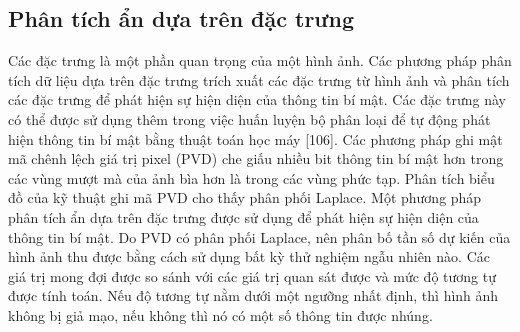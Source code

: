 \subsection{Phân tích ẩn dựa trên đặc trưng}
Các đặc trưng là một phần quan trọng của một hình ảnh. Các phương pháp phân tích dữ liệu dựa trên đặc trưng trích xuất các đặc trưng từ hình ảnh và phân tích các đặc trưng để phát hiện sự hiện diện của thông tin bí mật. Các đặc trưng này có thể được sử dụng thêm trong việc huấn luyện bộ phân loại để tự động phát hiện thông tin bí mật bằng thuật toán học máy [106]. Các phương pháp ghi mật mã chênh lệch giá trị pixel (PVD) che giấu nhiều bit thông tin bí mật hơn trong các vùng mượt mà của ảnh bìa hơn là trong các vùng phức tạp. Phân tích biểu đồ của kỹ thuật ghi mã PVD cho thấy phân phối Laplace. Một phương pháp phân tích ẩn dựa trên đặc trưng được sử dụng để phát hiện sự hiện diện của thông tin bí mật. Do PVD có phân phối Laplace, nên phân bố tần số dự kiến của hình ảnh thu được bằng cách sử dụng bất kỳ thử nghiệm ngẫu nhiên nào. Các giá trị mong đợi được so sánh với các giá trị quan sát được và mức độ tương tự được tính toán. Nếu độ tương tự nằm dưới một ngưỡng nhất định, thì hình ảnh không bị giả mạo, nếu không thì nó có một số thông tin được nhúng.